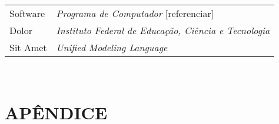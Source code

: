 \documentclass[12pt,a4paper]{article}
\begin{document}
	\begin{tabular}{p{3cm} p{}}
	  Software & \textit{Programa de Computador} [referenciar] \\
	  Dolor & \textit{Instituto Federal de Educação, Ciência e Tecnologia} \\
	  Sit Amet & \textit{Unified Modeling Language} \\
	\end{tabular}\\


	\newpage

	\section*{APÊNDICE}

	\lipsum[1]

	\newpage
\end{document}
